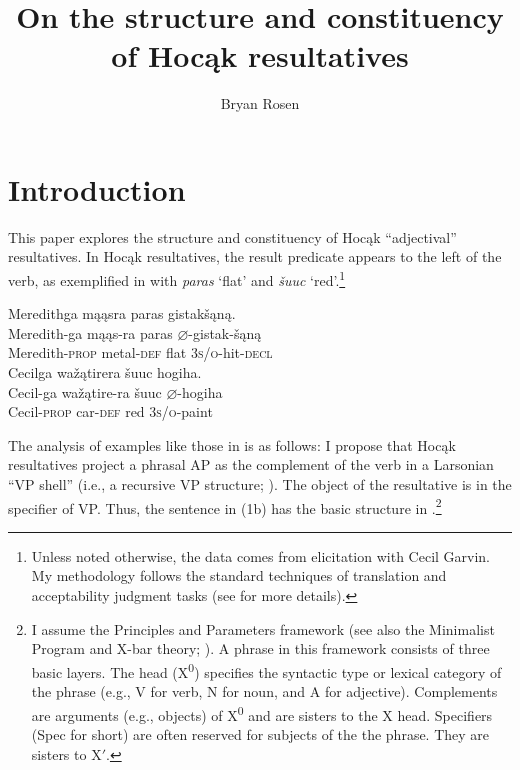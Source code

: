 \documentclass[output=paper]{LSP/langsci}
\author{Bryan Rosen}
\title{On the structure and constituency of Hocąk resultatives}
\begin{document}
\section{Introduction}\label{sec:rosen:1}

This paper explores the structure and constituency of Hocąk ``adjectival'' resultatives. In Hocąk resultatives, the result predicate appears to the left of the verb, as exemplified in  with \textit{paras} `flat' and \textit{šuuc} `red'.\footnote{Unless noted otherwise, the data comes from  elicitation with Cecil Garvin. My methodology follows the standard techniques of translation and acceptability judgment tasks (see \citealt{Matthewson2004} for more details).}

\ea\label{ex:rosen:1}
\ea
\glll Meredithga mąąsra paras gistakšąną. \\
 Meredith-ga mąąs-ra paras {$\varnothing$}-gistak-šąną\\
Meredith-\textsc{prop} metal-\textsc{def} flat  \textsc{3s/o}-hit-\textsc{decl}\\

\ex 
\glll Cecilga wažątirera šuuc hogiha. \\
Cecil-ga  wažątire-ra šuuc {$\varnothing$}-hogiha \\
Cecil-\textsc{prop} car-\textsc{def} red \textsc{3s/o}-paint\\
\z
\z


The analysis of examples like those in  is as follows: I propose that Hocąk resultatives project a phrasal AP as the complement of the verb in a Larsonian ``VP shell'' (i.e., a recursive VP structure; \citealt{Larson1988}). The object of the resultative is in the specifier of VP. Thus, the sentence in (1b) has the basic structure in .\footnote{I assume the Principles and Parameters framework (see also the Minimalist Program and X-bar theory; \citealt{Chomsky1995}). A phrase in this framework consists of three basic layers. The head (X\textsuperscript{0}) specifies the syntactic type or lexical category of the phrase (e.g., V for verb, N for noun, and A for adjective). Complements are arguments (e.g., objects) of X\textsuperscript{0} and are sisters to the X head. Specifiers (Spec for short) are often reserved for subjects of the the phrase. They are sisters to X$'$.}

\begin{exe}
\ex\label{ex:rosen:2}
{\hspace{1em}}\newline
{}
\end{exe}
\end{document}
